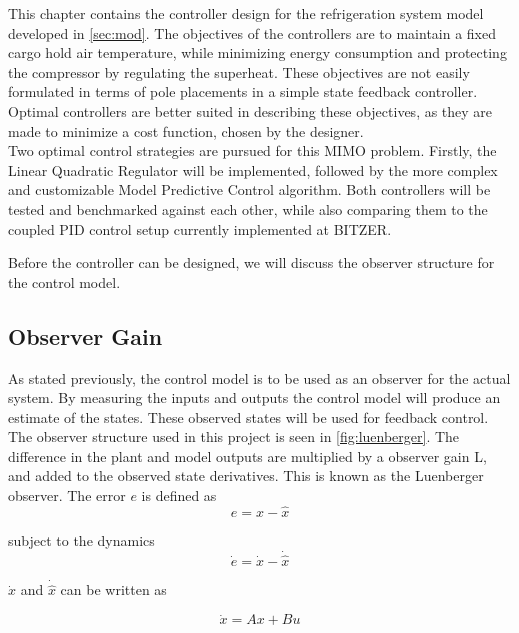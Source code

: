 This chapter contains the controller design for the refrigeration system model developed in \cref{sec:mod}. The objectives of the controllers are to maintain a fixed cargo hold air temperature, while minimizing energy consumption and protecting the compressor by regulating the superheat. These objectives are not easily formulated in terms of pole placements in a simple state feedback controller. Optimal controllers are better suited in describing these objectives, as they are made to minimize a cost function, chosen by the designer. \\

Two optimal control strategies are pursued for this MIMO problem. Firstly, the Linear Quadratic Regulator will be implemented, followed by the more complex and customizable Model Predictive Control algorithm. Both controllers will be tested and benchmarked against each other, while also comparing them to the coupled PID control setup currently implemented at BITZER.

Before the controller can be designed, we will discuss the observer structure for the control model.

\subsection{Observer Gain}\label{sec:observer-gain}
As stated previously, the control model is to be used as an observer for the actual system. By measuring the inputs and outputs the control model will produce an estimate of the states. These observed states will be used for feedback control. \\

The observer structure used in this project is seen in \cref{fig:luenberger}. The difference in the plant and model outputs are multiplied by a observer gain L, and added to the observed state derivatives. This is known as the Luenberger observer. The error $e$ is defined as
\begin{equation} \label{eq:error}
	e = x-\hat{x}
\end{equation}

subject to the dynamics
\begin{equation}
	\dot{e} = \dot{x}-\dot{\hat{x}}
\end{equation}

$\dot{x}$ and $\dot{\hat{x}}$ can be written as

\begin{equation}
	\dot{x} = Ax + Bu
\end{equation}

